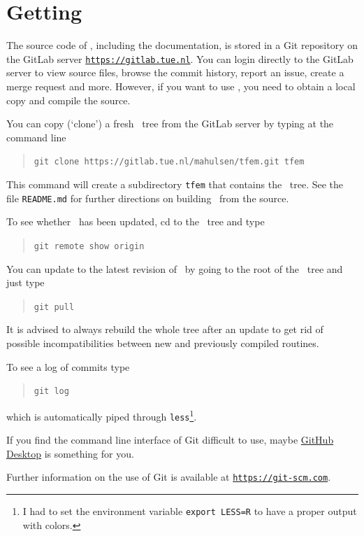 \newpage
\section{Getting \tfem}

The source code of \tfem, including the documentation, is stored in a Git
repository on the GitLab server \href{https://gitlab.tue.nl}{\texttt{https://gitlab.tue.nl}}. You can login directly to the GitLab server to view source files, browse the commit history, report an issue, create a merge request and more. However, if you want to use \tfem, you need to obtain a local copy and compile the source.

You can copy (`clone') a fresh \tfem\ tree from the GitLab server by typing at the command line
\begin{quote}
   \texttt{git clone https://gitlab.tue.nl/mahulsen/tfem.git tfem}
\end{quote}
This command will create a subdirectory \texttt{tfem} that contains the \tfem\ tree. See the file
\texttt{README.md}
for further directions on building \tfem\ from the source.

To see whether \tfem\ has been updated, cd to the \tfem\ tree and type
\begin{quote}
   \texttt{git remote show origin}
\end{quote}

You can update to the latest revision of \tfem\ by going to the root of the
\tfem\ tree and just type
\begin{quote}
  \texttt{git pull} 
\end{quote}
It is advised to always
rebuild the whole tree after an update to get rid of possible
incompatibilities between new
and previously compiled routines.

To see a log of commits type
\begin{quote}
   \texttt{git log}
\end{quote}
which is automatically piped through \texttt{less}\footnote{I had to set the environment variable \texttt{export LESS=R} to have a proper output with colors.}.

If you find the command line interface of Git difficult to use, maybe \href{https://desktop.github.com}{GitHub Desktop} is something for you.

Further information on the use of Git is available at \href{https://git-scm.com}{\texttt{https://git-scm.com}}.
